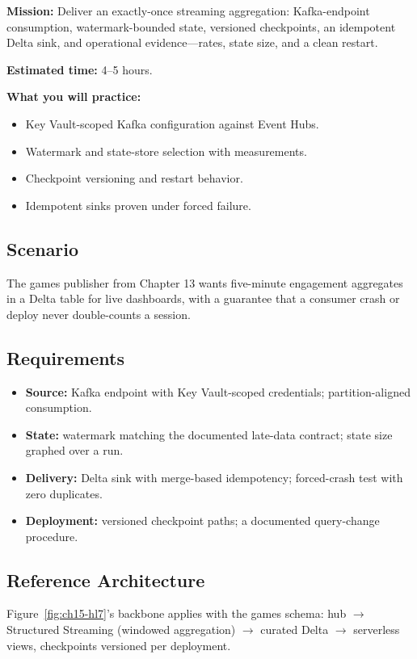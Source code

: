 \begin{capstonebox}
\textbf{Mission:} Deliver an exactly-once streaming aggregation: Kafka-endpoint consumption, watermark-bounded state, versioned checkpoints, an idempotent Delta sink, and operational evidence---rates, state size, and a clean restart.

\textbf{Estimated time:} 4--5 hours.

\textbf{What you will practice:}
\begin{itemize}
    \item Key Vault-scoped Kafka configuration against Event Hubs.
    \item Watermark and state-store selection with measurements.
    \item Checkpoint versioning and restart behavior.
    \item Idempotent sinks proven under forced failure.
\end{itemize}
\end{capstonebox}

\subsection*{Scenario}
The games publisher from Chapter 13 wants five-minute engagement aggregates in a Delta table for live dashboards, with a guarantee that a consumer crash or deploy never double-counts a session.

\subsection*{Requirements}
\begin{itemize}
    \item \textbf{Source:} Kafka endpoint with Key Vault-scoped credentials; partition-aligned consumption.
    \item \textbf{State:} watermark matching the documented late-data contract; state size graphed over a run.
    \item \textbf{Delivery:} Delta sink with merge-based idempotency; forced-crash test with zero duplicates.
    \item \textbf{Deployment:} versioned checkpoint paths; a documented query-change procedure.
\end{itemize}

\subsection*{Reference Architecture}
Figure~\ref{fig:ch15-hl7}'s backbone applies with the games schema: hub $\rightarrow$ Structured Streaming (windowed aggregation) $\rightarrow$ curated Delta $\rightarrow$ serverless views, checkpoints versioned per deployment.

